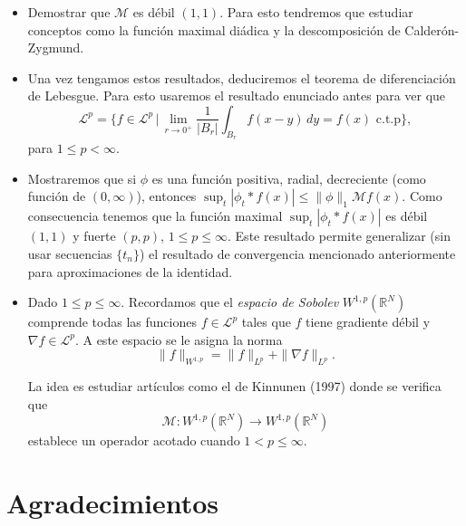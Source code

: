 \documentclass[a0,portrait]{a0poster}
\begin{document}
\begin{multicols}{2}
{{{\begin{minipage}{.93\columnwidth}
      \begin{itemize}
        \item Demostrar que $\mathcal{M}$ es débil $(1,1)$. Para esto tendremos que estudiar conceptos como la función maximal diádica y la descomposición de Calderón-Zygmund.
          \item Una vez tengamos estos resultados, deduciremos el teorema de diferenciación de Lebesgue.  Para esto usaremos el resultado enunciado antes para ver que 
          $$\mathcal{L}^p=\{f\in \mathcal{L}^p\, |\, \lim_{r\to 0^{+}} \frac{1}{|B_r|}\int_{B_r}f(x-y)\, dy=f(x)\, \,  \text{c.t.p}\},$$
          para $1\leq p <\infty$.
          \item Mostraremos que si $\phi$ es una función positiva, radial, decreciente (como función de $(0,\infty)$), entonces $\sup_{t}|\phi_t\ast f(x)|\leq \|\phi\|_1\mathcal{M}f(x)$. Como consecuencia tenemos que la función maximal $\sup_{t}|\phi_t\ast f(x)|$ es débil $(1,1)$ y fuerte $(p,p)$, $1\leq p \leq \infty$. Este resultado permite generalizar (sin usar secuencias $\{t_n\}$) el resultado de convergencia mencionado anteriormente para aproximaciones de la identidad.
          \item Dado $1\leq p\leq \infty$. Recordamos que el \emph{espacio de Sobolev} $W^{1,p}(\mathbb{R}^N)$ comprende todas las funciones $f\in \mathcal{L}^p$ tales que $f$ tiene gradiente débil y $\nabla f\in \mathcal{L}^p$. A este espacio se le asigna la norma
          \begin{equation*}
              \|f\|_{W^{1,p}}=\|f\|_{L^p}+\|\nabla f\|_{L^p}.
          \end{equation*}

      La idea es estudiar artículos como el de Kinnunen (1997) donde se verifica  que
      \begin{equation*}
          \mathcal{M}:W^{1,p}(\mathbb{R}^N)\rightarrow W^{1,p}(\mathbb{R}^N) 
      \end{equation*}
      establece un operador acotado cuando $1<p\leq \infty$.


            \end{itemize}
            
						\vspace{-0.3cm}
						
		\end{minipage}}}}
		\vspace{-1.5cm}
		
		\section{Agradecimientos}
		

\end{multicols}
\end{document}
